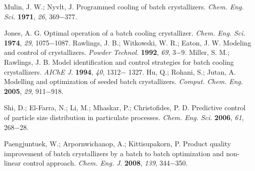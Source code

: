 \documentclass[a4paper, 11pt, oneside]{Thesis}  %
\begin{document}
\begin{thebibliography}{9}
Mulin, J. W.; Nyvlt, J. Programmed cooling of batch crystallizers.
\textit{Chem. Eng. Sci.} \textbf{1971}, \textit{26}, 369−377.

Jones, A. G. Optimal operation of a batch cooling crystallizer.
\textit{Chem. Eng. Sci.} \textbf{1974}, \textit{29}, 1075−1087.
 Rawlings, J. B.; Witkowski, W. R.; Eaton, J. W. Modeling and
control of crystallizers.\textit{ Powder Technol.} \textbf{1992}, \textit{69}, 3−9.
 Miller, S. M.; Rawlings, J. B. Model identification and control
strategies for batch cooling crystallizers. \textit{AIChE J.} \textbf{1994}, \textit{40}, 1312−
1327.
Hu, Q.; Rohani, S.; Jutan, A. Modelling and optimization of
seeded batch crystallizers. \textit{Comput. Chem. Eng.} \textbf{2005}, \textit{29}, 911−918.

Shi, D.; El-Farra, N.; Li, M.; Mhaskar, P.; Christofides, P. D.
Predictive control of particle size distribution in particulate processes.
\textit{Chem. Eng. Sci.} \textbf{2006}, \textit{61}, 268−28.

Paengjuntuek, W.; Arpornwichanop, A.; Kittisupakorn, P.
Product quality improvement of batch crystallizers by a batch to
batch optimization and non-linear control approach. \textit{Chem. Eng. J.}
\textbf{2008}, \textit{139}, 344−350.


\end{thebibliography}
\end{document}
